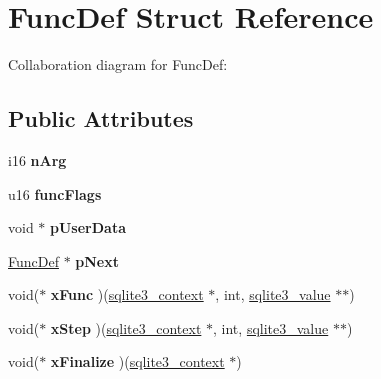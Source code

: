 \hypertarget{struct_func_def}{\section{Func\+Def Struct Reference}
\label{struct_func_def}
}


Collaboration diagram for Func\+Def\+:
\subsection*{Public Attributes}
\begin{DoxyCompactItemize}
\item 
\hypertarget{struct_func_def_a4ad90c05868ec8ee60c211b6e20299df}{i16 {\bfseries n\+Arg}}\label{struct_func_def_a4ad90c05868ec8ee60c211b6e20299df}

\item 
\hypertarget{struct_func_def_a4cd12fdb0da08ec8a5fb41f8bcd09e78}{u16 {\bfseries func\+Flags}}\label{struct_func_def_a4cd12fdb0da08ec8a5fb41f8bcd09e78}

\item 
\hypertarget{struct_func_def_a04fdde2f96be198823a483bebcfd3ae3}{void $\ast$ {\bfseries p\+User\+Data}}\label{struct_func_def_a04fdde2f96be198823a483bebcfd3ae3}

\item 
\hypertarget{struct_func_def_a1ebe547d000172d9ae44d12eeb433a48}{\hyperlink{struct_func_def}{Func\+Def} $\ast$ {\bfseries p\+Next}}\label{struct_func_def_a1ebe547d000172d9ae44d12eeb433a48}

\item 
\hypertarget{struct_func_def_a1cfd07fdfe22ff504ea7f36c0752c1da}{void($\ast$ {\bfseries x\+Func} )(\hyperlink{structsqlite3__context}{sqlite3\+\_\+context} $\ast$, int, \hyperlink{struct_mem}{sqlite3\+\_\+value} $\ast$$\ast$)}\label{struct_func_def_a1cfd07fdfe22ff504ea7f36c0752c1da}

\item 
\hypertarget{struct_func_def_ab1d1c623844534b17ea3ccce3f815464}{void($\ast$ {\bfseries x\+Step} )(\hyperlink{structsqlite3__context}{sqlite3\+\_\+context} $\ast$, int, \hyperlink{struct_mem}{sqlite3\+\_\+value} $\ast$$\ast$)}\label{struct_func_def_ab1d1c623844534b17ea3ccce3f815464}

\item 
\hypertarget{struct_func_def_a3c649453d5a58c697b7ee54ee999e7ef}{void($\ast$ {\bfseries x\+Finalize} )(\hyperlink{structsqlite3__context}{sqlite3\+\_\+context} $\ast$)}\label{struct_func_def_a3c649453d5a58c697b7ee54ee999e7ef}


\end{DoxyCompactItemize}
